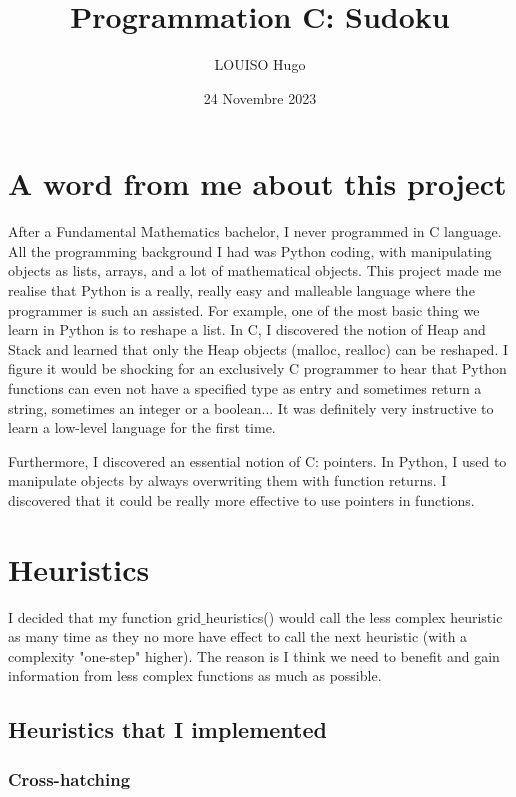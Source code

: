 \documentclass{article}
\title{Programmation C: Sudoku}
\author{LOUISO Hugo}
\date{24 Novembre 2023}
\begin{document}
\maketitle

\tableofcontents
\newpage
\section{A word from me about this project}

After a Fundamental Mathematics bachelor, I never programmed in C language. All the programming background I had was Python coding, with manipulating objects as lists, arrays, and a lot of mathematical objects. This project made me realise that Python is a really, really easy and malleable language where the programmer is such an assisted. For example, one of the most basic thing we learn in Python is to reshape a list. In C, I discovered the notion of Heap and Stack and learned that only the Heap objects (malloc, realloc) can be reshaped. I figure it would be shocking for an exclusively C programmer to hear that Python functions can even not have a specified type as entry and sometimes return a string, sometimes an integer or a boolean... It was definitely very instructive to learn a low-level language for the first time.

Furthermore, I discovered an essential notion of C: pointers. In Python, I used to manipulate objects by always overwriting them with function returns. I discovered that it could be really more effective to use pointers in functions.

\section{Heuristics}

I decided that my function grid$\_$heuristics() would call the less complex heuristic as many time as they no more have effect to call the next heuristic (with a complexity "one-step" higher). The reason is I think we need to benefit and gain information from less complex functions as much as possible.

\subsection{Heuristics that I implemented}

\subsubsection{Cross-hatching}
\end{document}
